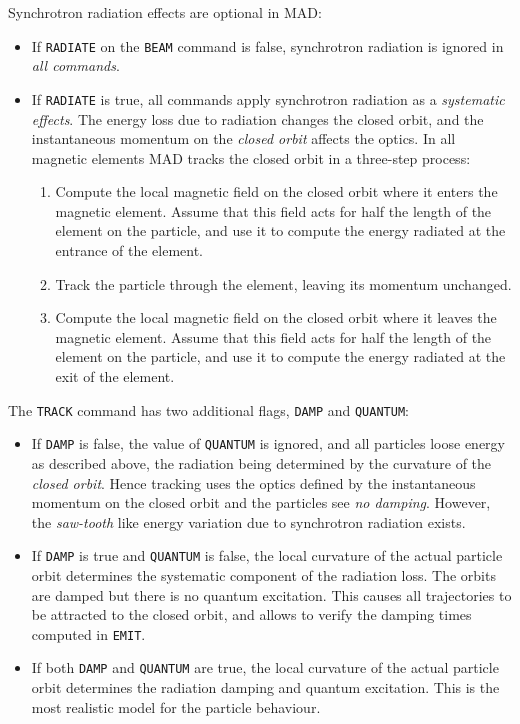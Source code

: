 Synchrotron radiation effects are optional in MAD:
\begin{itemize}
\item
  If {\tt RADIATE} on the {\tt BEAM} command is false,
  synchrotron radiation is ignored in {\em all commands}.
\item
  If {\tt RADIATE} is true,
  all commands apply synchrotron radiation as a {\em systematic effects}.
  The energy loss due to radiation changes the closed orbit,
  and the instantaneous momentum on the {\em closed orbit} affects the
  optics.
  In all magnetic elements MAD tracks the closed orbit in a three-step
  process:
  \begin{enumerate}
  \item
    Compute the local magnetic field on the closed orbit where it enters
    the magnetic element.
    Assume that this field acts for half the length of the element on
    the particle, and use it to compute the energy radiated at the
    entrance of the element.
  \item
    Track the particle through the element, leaving its momentum
    unchanged.
  \item
    Compute the local magnetic field on the closed orbit where it leaves
    the magnetic element.
    Assume that this field acts for half the length of the element on
    the particle, and use it to compute the energy radiated at the
    exit of the element.
  \end{enumerate}
\end{itemize}
 
The {\tt TRACK} command has two additional flags,
{\tt DAMP} and {\tt QUANTUM}:
\begin{itemize}
\item
  If {\tt DAMP} is false, the value of {\tt QUANTUM} is ignored,
  and all particles loose energy as described above,
  the radiation being determined by the curvature of the
  {\em closed orbit}. 
  Hence tracking uses the optics defined by the instantaneous momentum
  on the closed orbit and the particles see {\em no damping}.
  However, the {\em saw-tooth} like energy variation due to
  synchrotron radiation exists.
\item
  If {\tt DAMP} is true and {\tt QUANTUM} is false,
  the local curvature of the actual particle orbit determines the
  systematic component of the radiation loss.
  The orbits are damped but there is no quantum excitation.
  This causes all trajectories to be attracted to the closed orbit,
  and allows to verify the damping times computed in {\tt EMIT}. 
\item
  If both {\tt DAMP} and {\tt QUANTUM} are true,
  the local curvature of the actual particle orbit determines the
  radiation damping and quantum excitation.
  This is the most realistic model for the particle behaviour.
\end{itemize}
 
